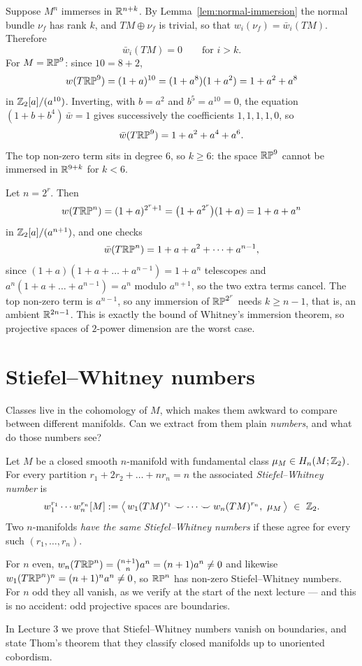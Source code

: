 \begin{example}[Immersions of $\RP^9$]\label{ex:immersion-RP9}
Suppose $M^n$ immerses in $\mathbb{R}^{n+k}$. By Lemma~\ref{lem:normal-immersion} the
normal bundle $\nu_f$ has rank $k$, and $TM\oplus\nu_f$ is trivial, so that
$w_i(\nu_f)=\bar w_i(TM)$. Therefore
\[
\bar w_i(TM)=0\qquad\text{for } i>k .
\]
For $M=\mathbb{RP}^9$: since $10=8+2$,
\[
w(T\mathbb{RP}^9)=(1+a)^{10}=(1+a^{8})(1+a^{2})=1+a^{2}+a^{8}
\]
in $\mathbb{Z}_2[a]/(a^{10})$. Inverting, with $b=a^2$ and $b^5=a^{10}=0$, the equation
$(1+b+b^4)\,\bar w=1$ gives successively the coefficients $1,1,1,1,0$, so
\[
\bar w(T\mathbb{RP}^9)=1+a^{2}+a^{4}+a^{6}.
\]
The top non-zero term sits in degree $6$, so $k\ge6$: the space $\RP^9$ cannot be
immersed in $\mathbb{R}^{9+k}$ for $k<6$.
\end{example}

\begin{example}[Immersions of $\RP^{2^r}$]
Let $n=2^r$. Then
\[
w(T\mathbb{RP}^n)=(1+a)^{2^r+1}=\big(1+a^{2^r}\big)(1+a)=1+a+a^{n}
\]
in $\mathbb{Z}_2[a]/(a^{n+1})$, and one checks
\[
\bar w(T\mathbb{RP}^{n})=1+a+a^2+\dots+a^{n-1},
\]
since $(1+a)(1+a+\dots+a^{n-1})=1+a^n$ telescopes and
$a^{n}(1+a+\dots+a^{n-1})=a^n$ modulo $a^{n+1}$, so the two extra terms cancel.
The top non-zero term is $a^{n-1}$, so any immersion of $\RP^{2^r}$ needs
$k\ge n-1$, that is, an ambient $\mathbb{R}^{2n-1}$. This is exactly the bound of
Whitney's immersion theorem, so projective spaces of $2$-power dimension are the
worst case.
\end{example}

\section{Stiefel--Whitney numbers}

\begin{guiding}
Classes live in the cohomology of $M$, which makes them awkward to compare
between different manifolds. Can we extract from them plain \emph{numbers}, and
what do those numbers see?
\end{guiding}

\begin{definition}
Let $M$ be a closed smooth $n$-manifold with fundamental class
$\mu_M\in H_n(M;\mathbb{Z}_2)$. For every partition
$r_1+2r_2+\dots+nr_n=n$ the associated \emph{Stiefel--Whitney number} is
\[
w_1^{r_1}\cdots w_n^{r_n}[M]
:=\big\langle\, w_1(TM)^{r_1}\smile\cdots\smile w_n(TM)^{r_n},\ \mu_M\,\big\rangle
\ \in\ \Z_2 .
\]
Two $n$-manifolds \emph{have the same Stiefel--Whitney numbers} if these agree
for every such $(r_1,\dots,r_n)$.
\end{definition}

\begin{example}
For $n$ even, $w_n(T\mathbb{RP}^n)=\binom{n+1}{n}a^n=(n+1)a^n\neq0$ and likewise
$w_1(T\mathbb{RP}^n)^n=(n+1)^na^n\neq0$, so $\mathbb{RP}^n$ has non-zero Stiefel--Whitney
numbers. For $n$ odd they all vanish, as we verify at the start of the next
lecture --- and this is no accident: odd projective spaces are boundaries.
\end{example}

In Lecture 3 we prove that Stiefel--Whitney numbers vanish on boundaries, and
state Thom's theorem that they classify closed manifolds up to unoriented
cobordism.

